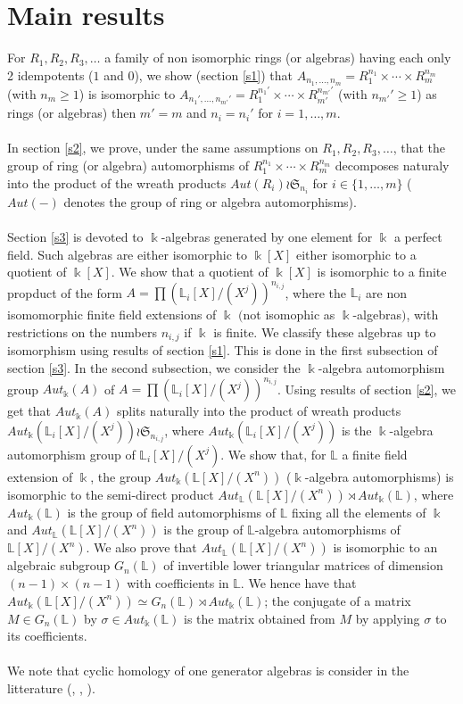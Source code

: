 \documentclass[12pt, reqno]{amsart}
\newcommand{\K}{ {\Bbbk} }
\newcommand{\FL}{ {\mathbb L} }
\begin{document}
\section*{Main results}
For $R_1,R_2,R_3,\dots$ a family of non isomorphic rings (or algebras) having each only 2 idempotents ($1$ and $0$), we show (section \ref{s1}) that  $A_{n_1,\dots,n_m}=R_1^{n_1}\times \cdots \times R_m^{n_m}$ (with $n_m\geq 1$)  is isomorphic to $A_{n_1',\dots,n_{m'}'}=R_1^{n_1'}\times \cdots \times R_{m'}^{n_{m'}'}$ (with $n_{m'}'\geq 1$) as rings (or algebras) then $m'=m$ and $n_i=n_i'$ for $i=1,\dots,m$.\\\\ In section \ref{s2}, we prove, under the same assumptions on $R_1,R_2,R_3,\dots$, that the group of ring (or algebra) automorphisms of $R_1^{n_1}\times \cdots \times R_m^{n_m}$ decomposes naturaly into the product of the wreath products $Aut( R_i)\wr \mathfrak{S}_{n_i}$ for $i\in \{1,\dots,m\}$ ($Aut(-)$ denotes the group of ring or algebra automorphisms). \\\\
Section \ref{s3} is devoted to $\K$-algebras generated by one element for $\K$ a perfect field. Such algebras are either isomorphic to $\K[X]$ either isomorphic to a quotient of $\K[X]$. We show that a quotient of $\K[X]$ is isomorphic to a finite propduct of the form $A=\prod (\FL_i[X]/(X^j))^{n_{i,j}}$, where the $\FL_i$ are non isomomorphic finite field extensions of $\K$ $($not isomophic as $\K$-algebras$)$, with restrictions on the numbers $n_{i,j}$ if $\K$ is finite. We classify these algebras up to isomorphism using results of section \ref{s1}. This is done in the first subsection of section \ref{s3}. In the second subsection, we consider the $\K$-algebra automorphism group $Aut_\K(A)$ of $A=\prod (\FL_i[X]/(X^j))^{n_{i,j}}$. Using results of section \ref{s2}, we get that $Aut_\K(A)$ splits naturally into the product of wreath products $Aut_\K(\FL_i[X]/(X^j) )\wr \mathfrak{S}_{n_{i,j}}$, where $Aut_\K(\FL_i[X]/(X^j))$ is the $\K$-algebra automorphism group of $\FL_i[X]/(X^j)$. We show that, for $\FL$ a finite field extension of $\K$, the group $Aut_\K(\FL[X]/(X^n))$ ($\K$-algebra automorphisms) is isomorphic to the semi-direct product $Aut_\FL(\FL[X]/(X^n)) \rtimes Aut_\K(\FL)$, where $Aut_\K(\FL)$ is the group of field automorphisms of $\FL$ fixing all the elements of $\K$ and $Aut_\FL(\FL[X]/(X^n))$ is the group of $\FL$-algebra automorphisms of $\FL[X]/(X^n)$. We also prove that $Aut_\FL(\FL[X]/(X^n))$ is isomorphic to an algebraic subgroup $G_n(\FL)$ of invertible lower triangular matrices of dimension $(n-1)\times (n-1)$ with coefficients in $\FL$. We hence have that $Aut_\K(\FL[X]/(X^n))\simeq G_n(\FL)\rtimes Aut_\K(\FL)$; the conjugate of a matrix $M\in G_n(\FL)$ by $\sigma \in Aut_\K(\FL)$ is the matrix obtained from $M$ by applying $\sigma$ to its coefficients.\\\\
We note that cyclic homology of one generator algebras is consider in the litterature (\cite{CC}, \cite{K}, \cite{CH}). 
 \tableofcontents
\end{document}
